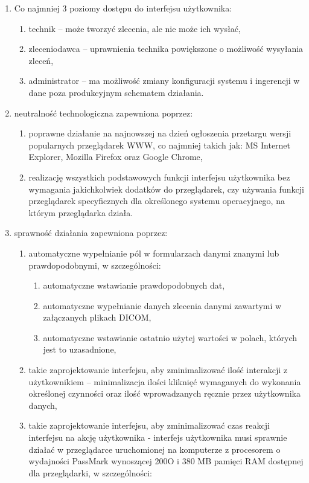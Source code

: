 \documentclass[a4paper]{report}
\begin{document}
\begin{enumerate}
    \item Co najmniej 3 poziomy dostępu do interfejsu użytkownika:
        \begin{enumerate}
        \item technik -- może tworzyć zlecenia, ale nie może ich wysłać,
        \item zleceniodawca -- uprawnienia technika powiększone o możliwość wysyłania zleceń,
        \item administrator -- ma możliwość zmiany konfiguracji systemu i ingerencji w dane poza produkcyjnym schematem działania.
        \end{enumerate}
    \item neutralność technologiczna zapewniona poprzez:
	  \begin{enumerate}
            \item poprawne działanie na najnowszej na dzień ogłoszenia przetargu wersji popularnych przeglądarek WWW, co najmniej takich jak: MS Internet Explorer, Mozilla Firefox oraz Google Chrome,
            \item realizację wszystkich podstawowych funkcji interfejsu użytkownika bez wymagania jakichkolwiek dodatków do przeglądarek, czy używania funkcji przeglądarek specyficznych dla określonego systemu operacyjnego, na którym przeglądarka działa.
	  \end{enumerate}
    \item sprawność działania zapewniona poprzez:
	  \begin{enumerate}
          \item automatyczne wypełnianie pól w formularzach danymi znanymi lub prawdopodobnymi, w szczególności:
            \begin{enumerate}
              \item automatyczne wstawianie prawdopodobnych dat,
              \item automatyczne wypełnianie danych zlecenia danymi zawartymi w załączanych plikach DICOM,
              \item automatyczne wstawianie ostatnio użytej wartości w polach, których jest to uzasadnione,
            \end{enumerate}
	  \item takie zaprojektowanie interfejsu, aby zminimalizować ilość interakcji z użytkownikiem -- minimalizacja ilości kliknięć wymaganych do wykonania określonej czynności oraz ilość wprowadzanych ręcznie przez użytkownika danych,
	  \item takie zaprojektowanie interfejsu, aby zminimalizować czas reakcji interfejsu na akcję użytkownika - interfejs użytkownika musi sprawnie działać w przeglądarce uruchomionej na komputerze z procesorem o wydajności PassMark wynoszącej 200O i 380 MB pamięci RAM dostępnej dla przeglądarki, w szczególności:

\end{enumerate}
\end{enumerate}
\end{document}

